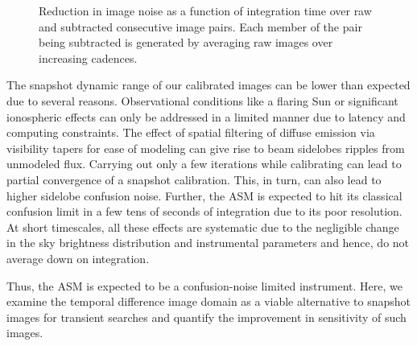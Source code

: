 \documentclass[referee]{aa}
\begin{document}
\begin{figure}[h]
\caption{\label{fig:Reduction-in-image}Reduction in image noise as a function of
  integration  time over  raw  and subtracted  consecutive  image pairs.   Each
  member of the pair being subtracted is generated by averaging raw images over
  increasing  cadences.}
\end{figure}

The snapshot dynamic  range of our calibrated images can  be lower than expected
due  to  several  reasons.   Observational  conditions like  a  flaring  Sun  or
significant ionospheric effects can only be addressed in a limited manner due to
latency and  computing constraints. The  effect of spatial filtering  of diffuse
emission  via visibility  tapers for  ease  of modeling  can give  rise to  beam
sidelobes ripples from unmodeled flux.  Carrying out only a few iterations while
calibrating can lead to partial  convergence of a snapshot calibration. This, in
turn, can  also lead  to higher  sidelobe confusion noise.  Further, the  ASM is
expected  to hit  its classical  confusion limit  in a  few tens  of  seconds of
integration due to its poor  resolution. At short timescales, all these effects
are systematic due  to the negligible change in  the sky brightness distribution
and instrumental parameters and hence, do not average down on integration.

Thus, the ASM is expected to  be a confusion-noise limited instrument.  Here, we
examine the temporal difference image domain as a viable alternative to snapshot
images for  transient searches and  quantify the improvement in  sensitivity of
such images.
\end{document}
